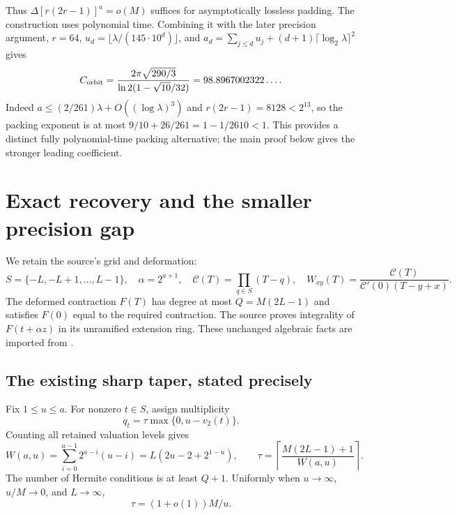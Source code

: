\documentclass[11pt]{article}
\theoremstyle{remark}\newtheorem{remark}[theorem]{Remark}
\newcommand{\vTwo}{v_2}
\newcommand{\lp}{\log_2}
\begin{document}
Thus $\Delta[r(2r-1)]^a=o(M)$ suffices for asymptotically lossless padding. The construction uses polynomial time. Combining it with the later precision argument, $r=64$, $u_d=\lfloor\lambda/(145\cdot10^d)\rfloor$, and $a_d=\sum_{j\le d}u_j+(d+1)\lceil\lp\lambda\rceil^2$ gives
\[
 C_{\rm orbit}=
 \frac{2\pi\sqrt{290/3}}{\ln2(1-\sqrt{10}/32)}
 =98.8967002322\ldots .
\]
Indeed $a\le(2/261)\lambda+O((\log\lambda)^3)$ and $r(2r-1)=8128<2^{13}$, so the packing exponent is at most $9/10+26/261=1-1/2610<1$. This provides a distinct fully polynomial-time packing alternative; the main proof below gives the stronger leading coefficient.

\section{Exact recovery and the smaller precision gap}
\label{sec:precision}

We retain the source's grid and deformation:
\[
 S=\{-L,-L+1,\ldots,L-1\},\quad
 \alpha=2^{a+1},\quad
 \mathcal C(T)=\prod_{q\in S}(T-q),\quad
 W_{xy}(T)=\frac{\mathcal C(T)}{\mathcal C'(0)(T-y+x)}.
\]
The deformed contraction $F(T)$ has degree at most $Q=M(2L-1)$ and satisfies $F(0)$ equal to the required contraction. The source proves integrality of $F(t+\alpha z)$ in its unramified extension ring. These unchanged algebraic facts are imported from \cite{source-contraction}.

\subsection{The existing sharp taper, stated precisely}
Fix $1\le u\le a$. For nonzero $t\in S$, assign multiplicity
\[
 q_t=\tau\max\{0,u-\vTwo(t)\}.
\]
Counting all retained valuation levels gives
\[
 W(a,u)=\sum_{i=0}^{u-1}2^{a-i}(u-i)
       =L(2u-2+2^{1-u}),\qquad
 \tau=\left\lceil\frac{M(2L-1)+1}{W(a,u)}\right\rceil.
\]
The number of Hermite conditions is at least $Q+1$. Uniformly when $u\to\infty$, $u/M\to0$, and $L\to\infty$,
\begin{equation}
 \tau=(1+o(1))M/u.
 \label{eq:taper}
\end{equation}
\end{document}

